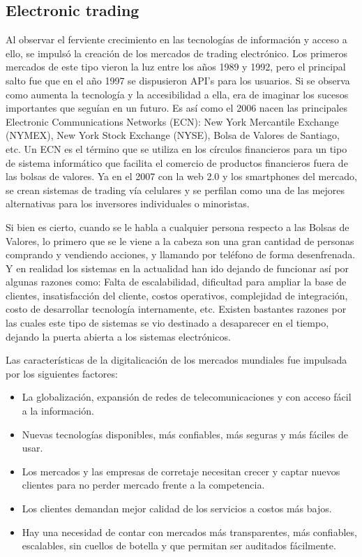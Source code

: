 \subsection{Electronic trading}
Al observar el ferviente crecimiento en las tecnologías de información y acceso a ello, se impulsó la creación de los mercados de trading electrónico. Los primeros
mercados de este tipo vieron la luz entre los años 1989 y 1992, pero el principal salto fue que en el año 1997 se dispusieron API's para los usuarios. Si se observa
como aumenta la tecnología y la accesibilidad a ella, era de imaginar los sucesos importantes que seguían en un futuro. Es así como el 2006 nacen las principales
Electronic Communications Networks (ECN): New York Mercantile Exchange (NYMEX), New York Stock Exchange (NYSE), Bolsa de Valores de Santiago, etc. Un ECN es el 
término que se utiliza en los círculos  financieros para un tipo de sistema informático que facilita el comercio de productos financieros fuera de las bolsas de 
valores. Ya en el 2007 con la web 2.0 y los smartphones del mercado, se crean sistemas de trading vía celulares y  se perfilan como una de las mejores alternativas 
para los inversores individuales o minoristas.

Si bien es cierto, cuando se le habla a cualquier persona respecto a las Bolsas de Valores, lo primero que se le viene a la cabeza son una gran cantidad de
personas comprando y vendiendo acciones, y llamando por teléfono de forma desenfrenada. Y en realidad los sistemas en la actualidad han ido dejando de funcionar así
por algunas razones como: Falta de escalabilidad, dificultad para ampliar la base de clientes, insatisfacción del cliente, costos operativos, complejidad de
integración, costo de desarrollar tecnología internamente, etc. Existen bastantes razones por las cuales este tipo de sistemas se vio destinado a desaparecer en el
tiempo, dejando la puerta abierta a los sistemas electrónicos.

Las características de la digitalicación de los mercados mundiales fue impulsada por los siguientes factores:
\begin{itemize}
        \item La globalización, expansión de redes de telecomunicaciones y con acceso fácil a la información.
        \item Nuevas tecnologías disponibles, más confiables, más seguras y más fáciles de usar.
        \item Los mercados y las empresas de corretaje necesitan crecer y captar nuevos clientes para no perder mercado frente a la competencia.
        \item Los clientes demandan mejor calidad de los servicios a costos más bajos.
        \item Hay una necesidad de contar con mercados más transparentes, más confiables, escalables, sin cuellos de botella y que permitan ser auditados fácilmente.
\end{itemize}


